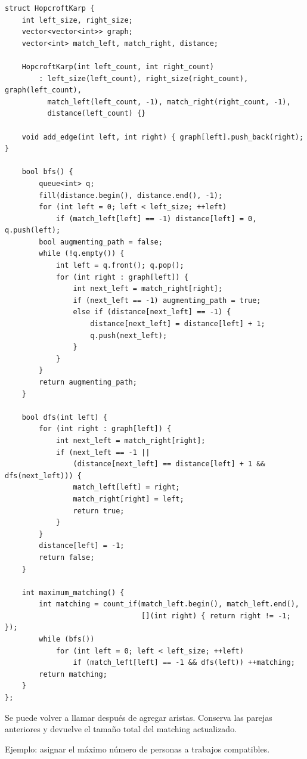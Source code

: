 \begin{lstlisting}[style=cpp]
struct HopcroftKarp {
    int left_size, right_size;
    vector<vector<int>> graph;
    vector<int> match_left, match_right, distance;

    HopcroftKarp(int left_count, int right_count)
        : left_size(left_count), right_size(right_count), graph(left_count),
          match_left(left_count, -1), match_right(right_count, -1),
          distance(left_count) {}

    void add_edge(int left, int right) { graph[left].push_back(right); }

    bool bfs() {
        queue<int> q;
        fill(distance.begin(), distance.end(), -1);
        for (int left = 0; left < left_size; ++left)
            if (match_left[left] == -1) distance[left] = 0, q.push(left);
        bool augmenting_path = false;
        while (!q.empty()) {
            int left = q.front(); q.pop();
            for (int right : graph[left]) {
                int next_left = match_right[right];
                if (next_left == -1) augmenting_path = true;
                else if (distance[next_left] == -1) {
                    distance[next_left] = distance[left] + 1;
                    q.push(next_left);
                }
            }
        }
        return augmenting_path;
    }

    bool dfs(int left) {
        for (int right : graph[left]) {
            int next_left = match_right[right];
            if (next_left == -1 ||
                (distance[next_left] == distance[left] + 1 && dfs(next_left))) {
                match_left[left] = right;
                match_right[right] = left;
                return true;
            }
        }
        distance[left] = -1;
        return false;
    }

    int maximum_matching() {
        int matching = count_if(match_left.begin(), match_left.end(),
                                [](int right) { return right != -1; });
        while (bfs())
            for (int left = 0; left < left_size; ++left)
                if (match_left[left] == -1 && dfs(left)) ++matching;
        return matching;
    }
};
\end{lstlisting}

Se puede volver a llamar despu\'es de agregar aristas. Conserva las parejas
anteriores y devuelve el tama\~no total del matching actualizado.

Ejemplo: asignar el m\'aximo n\'umero de personas a trabajos compatibles.


